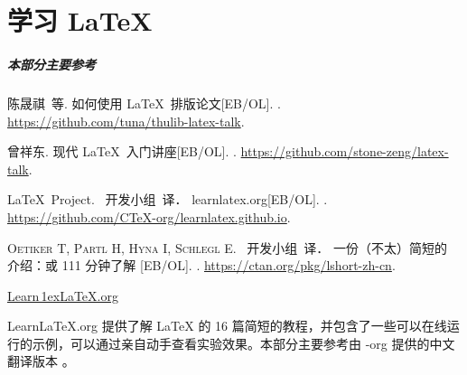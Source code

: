 
\part{学习 \LaTeX{}}

\begin{frame}
  \frametitle{本部分主要参考}
  \begin{bibliolist}{00}
    \onlineitem 陈晟祺~等.
    \newblock 如何使用 \LaTeX\ 排版论文[EB/OL].
    . \url{https://github.com/tuna/thulib-latex-talk}.

    \onlineitem 曾祥东.
    \newblock 现代 \LaTeX\ 入门讲座[EB/OL].
    . \url{https://github.com/stone-zeng/latex-talk}.

    \onlineitem \LaTeX\ Project.
    \CTeX\ 开发小组~译．
    \newblock learnlatex.org[EB/OL].
    . \url{https://github.com/CTeX-org/learnlatex.github.io}.

    \onlineitem \textsc{Oetiker T}, \textsc{Partl H}, \textsc{Hyna I}, \textsc{Schlegl E}.
    \CTeX\ 开发小组~译．
    \newblock 一份（不太）简短的 \LaTeXe{} 介绍：或 111 分钟了解 \LaTeXe{}[EB/OL]. \newblock{}.
    \url{https://ctan.org/pkg/lshort-zh-cn}.
  \end{bibliolist}

\end{frame}

\begin{frame}[plain]
  \vfil
  \begin{center}
    \href{https://learnlatex.org}{
      \rmfamily
      Learn\,\lower1ex\hbox{\Huge\LaTeX{}}.org
    }
  \end{center}
  \vfil
  \begin{center}
    \parbox{0.75\linewidth}{
      Learn\LaTeX{}.org 提供了解 \LaTeX{} 的 16 篇简短的教程，并包含了一些可以在线运行的示例，可以通过亲自动手查看实验效果。本部分主要参考由 \CTeX{}-org 提供的中文翻译版本 。
    }
  \end{center}
  \vfil
\end{frame}

